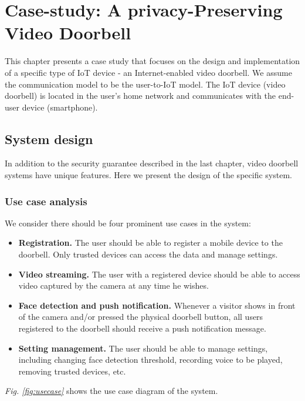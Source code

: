 \chapter{Case-study: A privacy-Preserving Video Doorbell}

This chapter presents a case study that focuses on the design and implementation of a specific type of IoT device - an Internet-enabled video doorbell. We assume the communication model to be the user-to-IoT model. The IoT device (video doorbell) is located in the user’s home network and communicates with the end-user device (smartphone).

\section{System design}
In addition to the security guarantee described in the last chapter, video doorbell systems have unique features. Here we present the design of the specific system.

\subsection{Use case analysis}
We consider there should be four prominent use cases in the system:
\begin{itemize}
	\item \textbf{Registration.} The user should be able to register a mobile device to the doorbell. Only trusted devices can access the data and manage settings.
	\item \textbf{Video streaming.} The user with a registered device should be able to access video captured by the camera at any time he wishes.
	\item \textbf{Face detection and push notification.} Whenever a visitor shows in front of the camera and/or pressed the physical doorbell button, all users registered to the doorbell should receive a push notification message.
	\item \textbf{Setting management.} The user should be able to manage settings, including changing face detection threshold, recording voice to be played, removing trusted devices, etc.
\end{itemize}

\textit{Fig. \ref{fig:usecase}} shows the use case diagram of the system.


